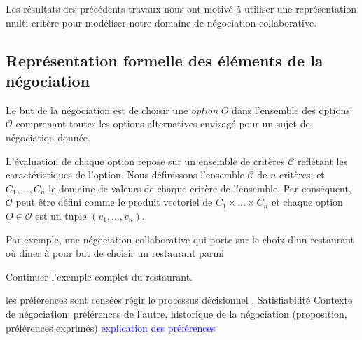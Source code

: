 
	Les résultats des précédents travaux nous ont motivé à utiliser une représentation multi-critère pour modéliser notre domaine de négociation collaborative. 
	
	\subsection{Représentation formelle des éléments de la négociation }	
	Le but de la négociation est de choisir une \textit{option} $O$ dans l'ensemble des options $\mathcal{O}$ comprenant toutes les options alternatives envisagé pour un sujet de négociation donnée. 
	
	L'évaluation de chaque option repose sur un ensemble de critères $\mathcal{C}$ reflétant les caractéristiques de l'option. Nous définissons l'ensemble $\mathcal{C}$ de $n$ critères, et $C_1,\ldots,C_n$ le domaine de valeurs de chaque critère de l'ensemble. 
	Par conséquent, $\mathcal{O}$ peut être défini comme le produit vectoriel de  $C_1\times\ldots\times C_n$ et chaque option $O \in \mathcal{O}$ est un tuple $(v_1,\ldots,v_n)$. 
	
		Par exemple, une négociation collaborative qui porte sur le choix d'un restaurant où dîner à pour but de choisir un restaurant parmi
		
		Continuer l'exemple complet du restaurant. 
	
	

les préférences sont censées régir le processus
décisionnel
, Satisfiabilité
Contexte de négociation: préférences de l'autre, historique de la négociation (proposition, préférences exprimés)
\textcolor{blue}{explication des préférences}
